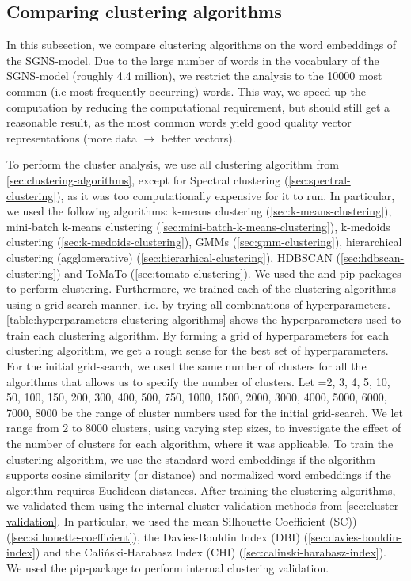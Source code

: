 \subsection{Comparing clustering algorithms}
\label{sec:comparing-clustering-algorithms}
In this subsection, we compare clustering algorithms on the word embeddings of the SGNS-model. Due to the large number of words in the vocabulary of the SGNS-model (roughly 4.4 million), we restrict the analysis to the 10000 most common (i.e most frequently occurring) words. This way, we speed up the computation by reducing the computational requirement, but should still get a reasonable result, as the most common words yield good quality vector representations (more data $\rightarrow$ better vectors).

To perform the cluster analysis, we use all clustering algorithm from \cref{sec:clustering-algorithms}, except for Spectral clustering (\cref{sec:spectral-clustering}), as it was too computationally expensive for it to run. In particular, we used the following algorithms: k-means clustering (\cref{sec:k-means-clustering}), mini-batch k-means clustering (\cref{sec:mini-batch-k-means-clustering}), k-medoids clustering (\cref{sec:k-medoids-clustering}), GMMs (\cref{sec:gmm-clustering}), hierarchical clustering (agglomerative) (\cref{sec:hierarhical-clustering}), HDBSCAN (\cref{sec:hdbscan-clustering}) and ToMaTo (\cref{sec:tomato-clustering}). We used the  \cite{ScikitLearn2011} and  \cite{mcinnes2017hdbscan} pip-packages to perform clustering. Furthermore, we trained each of the clustering algorithms using a grid-search manner, i.e. by trying all combinations of hyperparameters. \cref{table:hyperparameters-clustering-algorithms} shows the hyperparameters used to train each clustering algorithm. By forming a grid of hyperparameters for each clustering algorithm, we get a rough sense for the best set of hyperparameters. For the initial grid-search, we used the same number of clusters for all the algorithms that allows us to specify the number of clusters. Let =2, 3, 4, 5, 10, 50, 100, 150, 200, 300, 400, 500, 750, 1000, 1500, 2000, 3000, 4000, 5000, 6000, 7000, 8000 be the range of cluster numbers used for the initial grid-search. We let  range from 2 to 8000 clusters, using varying step sizes, to investigate the effect of the number of clusters for each algorithm, where it was applicable. To train the clustering algorithm, we use the standard word embeddings if the algorithm supports cosine similarity (or distance) and normalized word embeddings if the algorithm requires Euclidean distances. After training the clustering algorithms, we validated them using the internal cluster validation methods from \cref{sec:cluster-validation}. In particular, we used the mean Silhouette Coefficient (SC)) (\cref{sec:silhouette-coefficient}), the Davies-Bouldin Index (DBI) (\cref{sec:davies-bouldin-index}) and the Caliński-Harabasz Index (CHI) (\cref{sec:calinski-harabasz-index}). We used the  pip-package to perform internal clustering validation.
